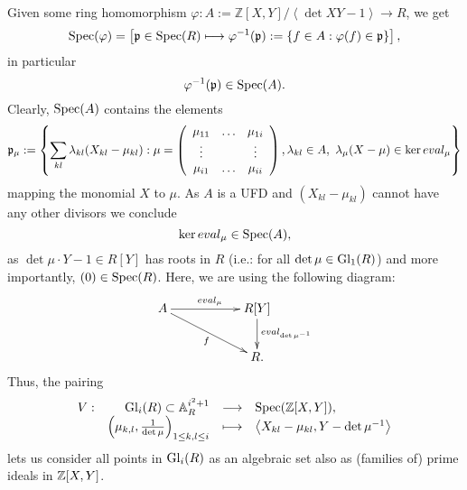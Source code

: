 
Given some ring homomorphism $\varphi : A := \mathbb{Z}[X,Y]/\left<\det X Y - 1\right> \longrightarrow R$, we get
$$\mathrm{Spec}(\varphi) = \left[\prm \in \mathrm{Spec}(R) \longmapsto \varphi^{-1}(\prm) := \{f \in A : \varphi(f) \in \prm\}\right],$$
in particular
$$\varphi^{-1}(\prm) \in \mathrm{Spec}(A).$$
Clearly, $\mrm{Spec}(A)$ contains the elements
$$\prm_\mu :=  \left\{\sum_{kl} \lambda_{kl} (X_{kl} - \mu_{kl}) : \mu = \left(\bao{ccc}\mu_{11}&\ldots&\mu_{1i}\\\vdots&&\vdots\\\mu_{i1}&\ldots&\mu_{ii}\\\ea\right), \lambda_{kl} \in A,\ \lambda_\mu (X - \mu) \in \ker eval_{\mu}\right\}$$
mapping the monomial $X$ to $\mu$. As $A$ is a UFD and $(X_{kl} - \mu_{kl})$ cannot have any other divisors we conclude $$\ker eval_\mu \in \spec{A},$$
as $\det \mu \cdot Y - 1 \in R[Y]$ has roots in $R$ (i.e.: for all $\det \mu \in \mrm{Gl}_1(R)$) and more importantly, $(0) \in \spec{R}$.
Here, we are using the following diagram:
$$\xymatrix{
A \ar[rr]^{eval_\mu}\ar[rrd]_f&&R[Y]\ar[d]^{eval_{\det \mu^{-1}}}\\
&&R.\\
}$$
Thus, the pairing
$$\bao{rrcl}
V :& \mrm{Gl}_i(R) \subset \affr{i^2+1} &\longrightarrow& \spec{\zz[X,Y]},\\
&\left(\mu_{k,l},\frac{1}{\det \mu}\right)_{1\leq k,l \leq i} &\longmapsto& \left<X_{kl} - \mu_{kl}, Y - \det \mu^{-1}\right>
\ea$$
lets us consider all points in $\mrm{Gl}_i(R)$ as an algebraic set also as (families of) prime ideals in $\zz[X,Y]$.